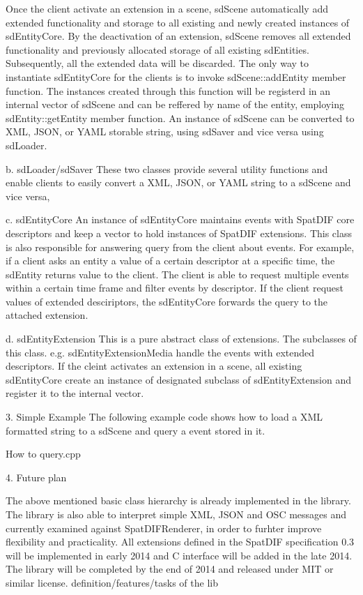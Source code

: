 \documentclass{article}
\begin{document}
Once the client activate an extension in a scene, sdScene automatically add extended functionality and storage to all existing and newly created instances of sdEntityCore. By the deactivation of an extension, sdScene removes all extended functionality and previously allocated storage of all existing sdEntities. Subsequently, all the extended data will be discarded.
The only way to instantiate sdEntityCore for the clients is to invoke sdScene::addEntity member function. The instances created through this function will be registerd in an internal vector
of sdScene and  can be reffered by name of the entity, employing sdEntity::getEntity member function. An instance of sdScene can be converted to XML, JSON, or YAML storable string, using sdSaver and vice versa using sdLoader.

b. sdLoader/sdSaver
These two classes provide several utility functions and enable clients to easily convert a XML, JSON, or YAML string to a sdScene and vice versa,

c. sdEntityCore
An instance of sdEntityCore maintains events with SpatDIF core descriptors and keep a vector to hold instances of SpatDIF extensions. This class is also responsible for answering query from the client about events. For example, if a client asks an entity a value of a certain descriptor at a specific time, the sdEntity returns value to the client. The client is able to request multiple events within a certain time frame and filter events by descriptor. If the client request values of extended desciriptors, the sdEntityCore forwards the query to the attached extension.

d. sdEntityExtension
This is a pure abstract class of extensions. The subclasses of this class. e.g. sdEntityExtensionMedia handle the events with extended descriptors. If the cleint activates an extension in a scene, all existing sdEntityCore create an instance of designated subclass of sdEntityExtension and register it to the internal vector.

3. Simple Example
The following example code shows how to load a XML formatted string to a sdScene and query a event stored in it.

How to query.cpp





4. Future plan

The above mentioned basic class hierarchy is already implemented in the library. The library is also able to interpret simple XML, JSON and OSC messages and currently examined against SpatDIFRenderer, in order to furhter improve flexibility and practicality.  All extensions defined in the SpatDIF specification 0.3 will be implemented in early 2014 and C interface will be added in the late 2014. The library will be completed by the end of 2014 and released under MIT or similar license.
definition/features/tasks of the lib
\end{document}
